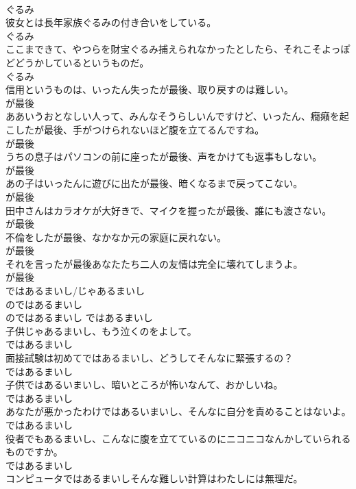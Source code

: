 \documentclass[8pt]{extreport}
\begin{document}
\begin{CJK}{UTF8}{min}
\\	ぐるみ
\\	彼女とは長年家族ぐるみの付き合いをしている。	
\\	ぐるみ
\\	ここまできて、やつらを財宝ぐるみ捕えられなかったとしたら、それこそよっぽどどうかしているというものだ。	
\\	ぐるみ
\\	信用というものは、いったん失ったが最後、取り戻すのは難しい。	
\\	が最後
\\	ああいうおとなしい人って、みんなそうらしいんですけど、いったん、癇癪を起こしたが最後、手がつけられないほど腹を立てるんですね。	
\\	が最後
\\	うちの息子はパソコンの前に座ったが最後、声をかけても返事もしない。	
\\	が最後
\\	あの子はいったんに遊びに出たが最後、暗くなるまで戻ってこない。	
\\	が最後
\\	田中さんはカラオケが大好きで、マイクを握ったが最後、誰にも渡さない。	
\\	が最後
\\	不倫をしたが最後、なかなか元の家庭に戻れない。	
\\	が最後
\\	それを言ったが最後あなたたち二人の友情は完全に壊れてしまうよ。	
\\	が最後
\\	ではあるまいし/じゃあるまいし	
\\	のではあるまいし	
\\	のではあるまいし	ではあるまいし
\\	子供じゃあるまいし、もう泣くのをよして。	
\\	ではあるまいし
\\	面接試験は初めてではあるまいし、どうしてそんなに緊張するの？	
\\	ではあるまいし
\\	子供ではあるいまいし、暗いところが怖いなんて、おかしいね。	
\\	ではあるまいし
\\	あなたが悪かったわけではあるいまいし、そんなに自分を責めることはないよ。	
\\	ではあるまいし
\\	役者でもあるまいし、こんなに腹を立てているのにニコニコなんかしていられるものですか。	
\\	ではあるまいし
\\	コンピュータではあるまいしそんな難しい計算はわたしには無理だ。	

\end{CJK}
\end{document}
